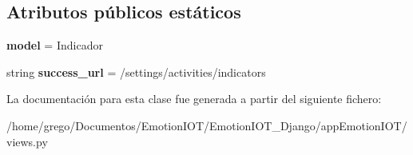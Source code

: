 \subsection*{Atributos públicos estáticos}
\begin{DoxyCompactItemize}
\item 
{\bfseries model} = Indicador\hypertarget{classappEmotionIOT_1_1views_1_1Indicador__delete_a4d6b0bb029f796c114982d1fa022d208}{}\label{classappEmotionIOT_1_1views_1_1Indicador__delete_a4d6b0bb029f796c114982d1fa022d208}

\item 
string {\bfseries success\+\_\+url} = \textquotesingle{}/settings/activities/indicators\textquotesingle{}\hypertarget{classappEmotionIOT_1_1views_1_1Indicador__delete_adc0a66cabb0270ec42ca437b349a83a6}{}\label{classappEmotionIOT_1_1views_1_1Indicador__delete_adc0a66cabb0270ec42ca437b349a83a6}

\end{DoxyCompactItemize}


La documentación para esta clase fue generada a partir del siguiente fichero\+:\begin{DoxyCompactItemize}
\item 
/home/grego/\+Documentos/\+Emotion\+I\+O\+T/\+Emotion\+I\+O\+T\+\_\+\+Django/app\+Emotion\+I\+O\+T/views.\+py\end{DoxyCompactItemize}
